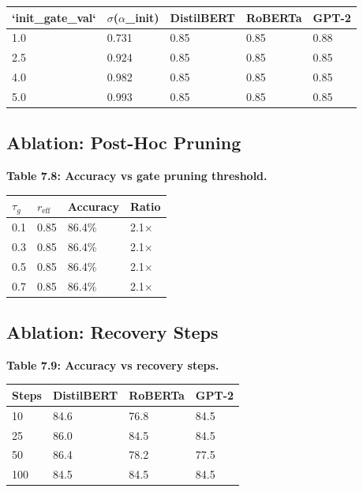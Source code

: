 \begin{table}[H]
\centering
\small
\begin{tabular}{lllll}
\toprule
\textbf{`init\_gate\_val`} & \textbf{$\sigma$($\alpha$\_init)} & \textbf{DistilBERT} & \textbf{RoBERTa} & \textbf{GPT-2} \\
\midrule
1.0 & 0.731 & 0.85 & 0.85 & 0.88 \\
2.5 & 0.924 & 0.85 & 0.85 & 0.85 \\
4.0 & 0.982 & 0.85 & 0.85 & 0.85 \\
5.0 & 0.993 & 0.85 & 0.85 & 0.85 \\
\bottomrule
\end{tabular}
\end{table}

\subsection{Ablation: Post-Hoc Pruning}

\textbf{Table 7.8: Accuracy vs gate pruning threshold.}

\begin{table}[H]
\centering
\small
\begin{tabular}{llll}
\toprule
\textbf{$\tau_g$} & \textbf{$r_\text{eff}$} & \textbf{Accuracy} & \textbf{Ratio} \\
\midrule
0.1 & 0.85 & 86.4\% & 2.1$\times$ \\
0.3 & 0.85 & 86.4\% & 2.1$\times$ \\
0.5 & 0.85 & 86.4\% & 2.1$\times$ \\
0.7 & 0.85 & 86.4\% & 2.1$\times$ \\
\bottomrule
\end{tabular}
\end{table}

\subsection{Ablation: Recovery Steps}

\textbf{Table 7.9: Accuracy vs recovery steps.}

\begin{table}[H]
\centering
\small
\begin{tabular}{llll}
\toprule
\textbf{Steps} & \textbf{DistilBERT} & \textbf{RoBERTa} & \textbf{GPT-2} \\
\midrule
10 & 84.6 & 76.8 & 84.5 \\
25 & 86.0 & 84.5 & 84.5 \\
50 & 86.4 & 78.2 & 77.5 \\
100 & 84.5 & 84.5 & 84.5 \\
\bottomrule
\end{tabular}
\end{table}

